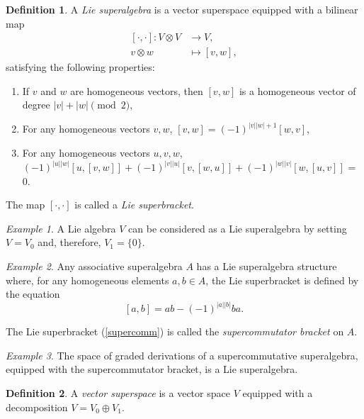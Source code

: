 \documentclass[12pt]{article}
\theoremstyle{definition}
\newtheorem{dfn}{Definition}
\theoremstyle{remark}
\newtheorem{ex}{Example}
\begin{document}
\begin{dfn}
  A \emph{Lie superalgebra} is a vector superspace equipped with a bilinear map
\begin{equation}
\begin{split}
[\cdot,\cdot]: V \otimes V &\rightarrow V, \\
v \otimes w &\mapsto [v, w],
\end{split}
\end{equation}
satisfying the following properties:
\begin{enumerate}
\item If $v$ and $w$ are homogeneous vectors, then $[v,w]$ is a homogeneous vector of degree $|v| + |w| \pmod 2$,
\item For any homogeneous vectors $v, w$, $[v,w] = (-1)^{|v||w| + 1} [w,v]$,
\item For any homogeneous vectors $u,v,w$, $(-1)^{|u||w|}[u, [v,w]] + (-1)^{|v||u|} [v, [w, u]] + (-1)^{|w||v|} [w,[u,v]]$ = 0.
\end{enumerate}
The map $[\cdot,\cdot]$ is called a \emph{Lie superbracket}.
\end{dfn}

\begin{ex}
A Lie algebra $V$ can be considered as a Lie superalgebra by setting $V = V_0$ and, therefore, $V_1 = \{0\}$.
\end{ex}

\begin{ex}
Any associative superalgebra $A$ has a Lie superalgebra structure where, for any homogeneous elements $a,b \in A$, the Lie superbracket is defined by the equation
\begin{equation}\label{supercomm}
[a, b] = ab - (-1)^{|a||b|}ba.
\end{equation}

 The Lie superbracket (\ref{supercomm}) is called the \emph{supercommutator bracket} on $A$.
\end{ex}



\begin{ex}
  The space of graded derivations of a supercommutative superalgebra, equipped with the supercommutator bracket, is a Lie superalgebra.
\end{ex}



\begin{dfn}
A \emph{vector superspace} is a vector space $V$ equipped with a decomposition $V = V_0 \oplus V_1$.  
\end{dfn}
\end{document}
